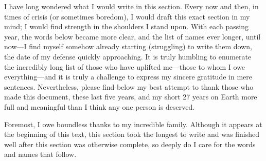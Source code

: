 \begin{acknowledgements}
I have long wondered what I would write in this section. 
Every now and then, in times of crisis (or sometimes boredom), I would draft this exact section in my mind; I would find strength in the shoulders I stand upon. 
With each passing year, the words below became more clear, and the list of names ever longer, until now---I find myself somehow already starting (struggling) to write them down, the date of my defense quickly approaching. 
It is truly humbling to enumerate the incredibly long list of those who have uplifted me---those to whom I owe everything---and it is truly a challenge to express my sincere gratitude in mere sentences. 
Nevertheless, please find below my best attempt to thank those who made this document, these last five years, and my short 27 years on Earth more full and meaningful than I think any one person is deserved.

Foremost, I owe boundless thanks to my incredible family. 
Although it appears at the beginning of this text, this section took the longest to write and was finished well after this section was otherwise complete, so deeply do I care for the words and names that follow. 


\end{acknowledgements}
